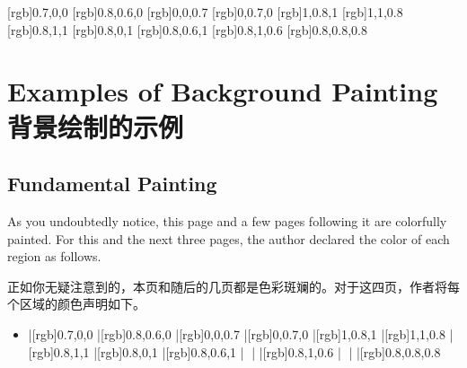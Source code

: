 [rgb]{0.7,0,0}
[rgb]{0.8,0.6,0}
[rgb]{0,0,0.7}
[rgb]{0,0.7,0}
[rgb]{1,0.8,1}
[rgb]{1,1,0.8}
[rgb]{0.8,1,1}
[rgb]{0.8,0,1}
[rgb]{0.8,0.6,1}
[rgb]{0.8,1,0.6}
[rgb]{0.8,0.8,0.8}

\section{Examples of Background Painting\hfill 背景绘制的示例}
\label{sec:bgpaint}
\subsection{Fundamental Painting}
\label{sec:bgpaint-fund}
\twosided[pcm]

As you undoubtedly notice, this page and a few pages following it are
colorfully painted.  For this and the next three pages, the author
declared the \bground{} color of each region as follows.

正如你无疑注意到的，本页和随后的几页都是色彩斑斓的。对于这四页，作者将每个区域的\bground{}颜色声明如下。
\begin{itemize}\item[]
|[rgb]{0.7,0,0}       %
|[rgb]{0.8,0.6,0}     %
|[rgb]{0,0,0.7}       %
|[rgb]{0,0.7,0}       %
|[rgb]{1,0.8,1}    %
|[rgb]{1,1,0.8}    %
|[rgb]{0.8,1,1}       %
|[rgb]{0.8,0,1}       %
|[rgb]{0.8,0.6,1}     |
    |%
|[rgb]{0.8,1,0.6}     |
    |%
|[rgb]{0.8,0.8,0.8}   %
\end{itemize}

\SpecialUsageIndex{\backgroundcolor}

